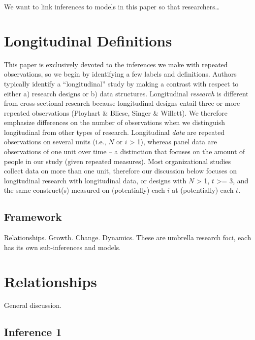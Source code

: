 \documentclass[english,,man]{apa6}
\theoremstyle{definition}
\theoremstyle{definition}
\theoremstyle{definition}
\theoremstyle{remark}
\begin{document}
We want to link inferences to models in this paper so that
researchers\ldots{}

\hypertarget{longitudinal-definitions}{%
\section{Longitudinal Definitions}\label{longitudinal-definitions}}

This paper is exclusively devoted to the inferences we make with
repeated observations, so we begin by identifying a few labels and
definitions. Authors typically identify a \enquote{longitudinal} study
by making a contrast with respect to either a) research designs or b)
data structures. Longitudinal \emph{research} is different from
cross-sectional research because longitudinal designs entail three or
more repeated observations (Ployhart \& Bliese, Singer \& Willett). We
therefore emphasize differences on the number of observations when we
distinguish longitudinal from other types of research. Longitudinal
\emph{data} are repeated observations on several units (i.e., \(N\) or
\(i\) \textgreater{} 1), whereas panel data are observations of one unit
over time -- a distinction that focuses on the amount of people in our
study (given repeated measures). Most organizational studies collect
data on more than one unit, therefore our discussion below focuses on
longitudinal research with longitudinal data, or designs with \(N\)
\textgreater{} 1, \(t\) \textgreater{}= 3, and the same construct(s)
measured on (potentially) each \(i\) at (potentially) each \(t\).

\hypertarget{framework}{%
\subsection{Framework}\label{framework}}

Relationships. Growth. Change. Dynamics. These are umbrella research
foci, each has its own sub-inferences and models.

\hypertarget{relationships}{%
\section{Relationships}\label{relationships}}

General discussion.

\hypertarget{inference-1}{%
\subsection{Inference 1}\label{inference-1}}
\end{document}
